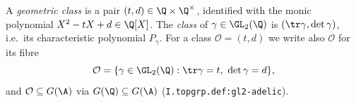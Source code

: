 A \emph{geometric class} is a pair $(t,d)\in\Q\times\Q^\times$, identified with the monic polynomial $X^2-tX+d\in\Q[X]$. The
\emph{class} of $\gamma\in\GL_2(\Q)$ is $(\tr\gamma,\det\gamma)$, i.e.\ its characteristic polynomial $P_\gamma$. For a class $\mathcal O=(t,d)$ we write
also $\mathcal O$ for its fibre
\[
  \mathcal O=\{\gamma\in\GL_2(\Q):\tr\gamma=t,\ \det\gamma=d\},
\]
and $\mathcal O\subseteq G(\A)$ via $G(\Q)\subseteq G(\A)$ (\texttt{I.topgrp.def:gl2-adelic}).
